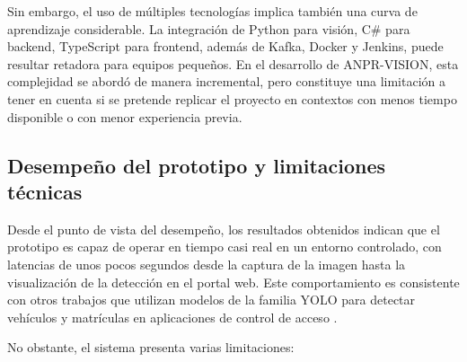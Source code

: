 Sin embargo, el uso de múltiples tecnologías implica también una curva de aprendizaje considerable. La integración de Python para visión, C\# para backend, TypeScript para frontend, además de Kafka, Docker y Jenkins, puede resultar retadora para equipos pequeños. En el desarrollo de ANPR-VISION, esta complejidad se abordó de manera incremental, pero constituye una limitación a tener en cuenta si se pretende replicar el proyecto en contextos con menos tiempo disponible o con menor experiencia previa.

\subsection{Desempeño del prototipo y limitaciones técnicas}

Desde el punto de vista del desempeño, los resultados obtenidos indican que el prototipo es capaz de operar en tiempo casi real en un entorno controlado, con latencias de unos pocos segundos desde la captura de la imagen hasta la visualización de la detección en el portal web. Este comportamiento es consistente con otros trabajos que utilizan modelos de la familia YOLO para detectar vehículos y matrículas en aplicaciones de control de acceso \cite{deep_anpr_pipeline_access_control_2022,yolo_high_precision_lpr_2024}.

No obstante, el sistema presenta varias limitaciones:


